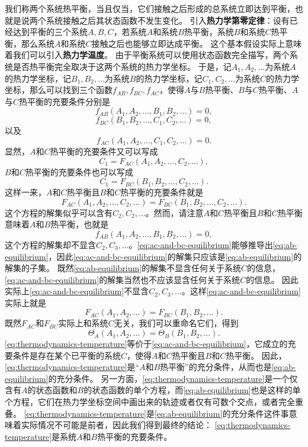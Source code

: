 \documentclass[hyperref, UTF8, a4paper]{ctexart}
\begin{document}
我们称两个系统热平衡，当且仅当，它们接触之后形成的总系统立即达到平衡，也就是说两个系统接触之后其状态函数不发生变化。
引入\textbf{热力学第零定律}：设有已经达到平衡的三个系统$A,B,C$，若系统$A$和系统$B$热平衡，系统$B$和系统$C$热平衡，那么系统$A$和系统$C$接触之后也能够立即达成平衡。
这个基本假设实际上意味着我们可以引入\textbf{热力学温度}。
由于平衡系统可以使用状态函数完全描写，两个系统是否热平衡完全取决于这两个系统的热力学坐标。
于是，记$A_1, A_2, \ldots$为系统$A$的热力学坐标，记$B_1, B_2, \ldots$为系统$B$的热力学坐标，记$C_1, C_2, \ldots$为系统$C$的热力学坐标，那么可以找到三个函数$f_{AB}, f_{BC}, f_{AC}$，使得$A$与$B$热平衡、$B$与$C$热平衡、$A$与$C$热平衡的充要条件分别是
\[
    f_{AB} (A_1, A_2, \ldots, B_1, B_2, \ldots) = 0,
\]
\[
    f_{BC} (B_1, B_2, \ldots, C_1, C_2, \ldots) = 0,
\]
以及
\[
    f_{AC} (A_1, A_2, \ldots, C_1, C_2, \ldots) = 0. 
\]
显然，$A$和$C$热平衡的充要条件又可以写成
\[
    C_1 = F_{AC} (A_1, A_2, \ldots, C_2, \ldots),
\]
$B$和$C$热平衡的充要条件也可以写成
\[
    C_1 = F_{BC} (B_1, B_2, \ldots, C_2, \ldots).
\]
这样一来，$A$和$C$热平衡且$B$和$C$热平衡的充要条件就是
\begin{equation}
    F_{AC} (A_1, A_2, \ldots, C_2, \ldots) = F_{BC} (B_1, B_2, \ldots, C_2, \ldots).
    \label{eq:ac-and-bc-equilibrium}
\end{equation}
这个方程的解集似乎可以含有$C_2, C_2, \ldots$。然而，请注意$A$和$C$热平衡且$B$和$C$热平衡意味着$A$和$B$热平衡，也就是
\begin{equation}
    f_{AB} (A_1, A_2, \ldots, B_1, B_2, \ldots) = 0,
    \label{eq:ab-equilibrium}
\end{equation}
这个方程的解集却不显含$C_2, C_3, \ldots$。\eqref{eq:ac-and-bc-equilibrium}能够推导出\eqref{eq:ab-equilibrium}，因此\eqref{eq:ac-and-bc-equilibrium}的解集只应该是\eqref{eq:ab-equilibrium}的解集的子集。
既然\eqref{eq:ab-equilibrium}的解集不显含任何关于系统$C$的信息，\eqref{eq:ac-and-bc-equilibrium}的解集当然也不应该显含任何关于系统$C$的信息。
因此实际上\eqref{eq:ac-and-bc-equilibrium}不显含$C_2, C_3, \ldots$。这样\eqref{eq:ac-and-bc-equilibrium}实际上就是
\[
    F_{AC} (A_1, A_2, \ldots) = F_{BC} (B_1, B_2, \ldots).
\]
既然$F_{AC}$和$F_{BC}$实际上和系统$C$无关，我们可以重命名它们，得到
\begin{equation}
    \Theta_A (A_1, A_2, \ldots) = \Theta_B (B_1, B_2, \ldots).
    \label{eq:thermodynamics-temperature}
\end{equation}
\eqref{eq:thermodynamics-temperature}等价于\eqref{eq:ac-and-bc-equilibrium}，它成立的充要条件是存在某个已平衡的系统$C$，使得$A$和$C$热平衡且$B$和$C$热平衡。
因此，\eqref{eq:thermodynamics-temperature}是“$A$和$B$热平衡”的充分条件，从而也是\eqref{eq:ab-equilibrium}的充分条件。
另一方面，\eqref{eq:thermodynamics-temperature}是一个仅含有$A$的状态函数和$B$的状态函数的单个方程，而\eqref{eq:ab-equilibrium}也是这样的单个方程，它们在热力学坐标空间中画出来的轨迹或者仅有可数个交点，或者完全重叠。
\eqref{eq:thermodynamics-temperature}是\eqref{eq:ab-equilibrium}的充分条件这件事意味着实际情况不可能是前者，因此我们得到最终的结论：
\eqref{eq:thermodynamics-temperature}是系统$A$和$B$热平衡的充要条件。
\end{document}
